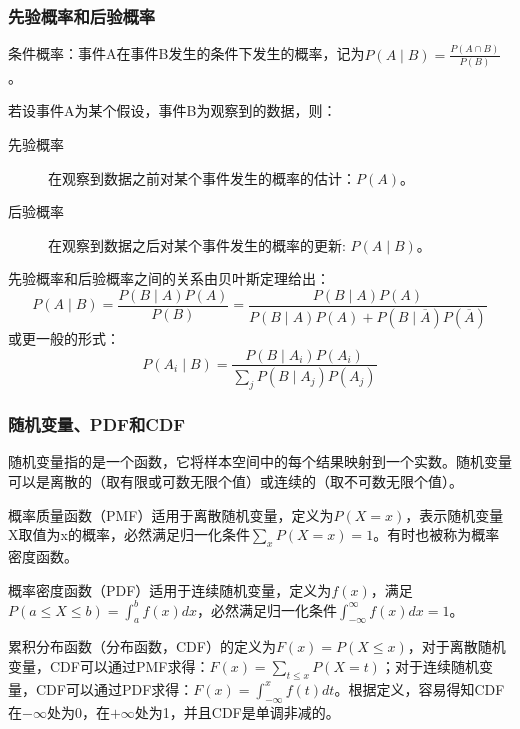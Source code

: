 \documentclass[aspectratio=1610]{ctexbeamer}
\begin{document}
\begin{frame}
    \frametitle{先验概率和后验概率}

    条件概率：事件A在事件B发生的条件下发生的概率，记为$P(A \mid B) = \frac{P(A \cap B)}{P(B)}$。

    \vspace{1em}
    \pause

    若设事件A为某个假设，事件B为观察到的数据，则：
    \begin{description}
        \item[先验概率] 在观察到数据之前对某个事件发生的概率的估计：$P(A)$。
        \item[后验概率] 在观察到数据之后对某个事件发生的概率的更新: $P(A \mid B)$。
    \end{description}

    \vspace{1em}
    \pause

    先验概率和后验概率之间的关系由贝叶斯定理给出：
    \begin{equation}
P(A \mid B) = \frac{P(B \mid A)P(A)}{P(B)} = \frac{P(B \mid A)P(A)}{P(B \mid A)P(A) + P(B \mid \overline{A})P(\overline{A})} \tag{贝叶斯定理的二元形式}
    \end{equation}
    或更一般的形式：
    \begin{equation}
P(A_i \mid B) = \frac{P(B \mid A_i)P(A_i)}{\sum_j P(B \mid A_j)P(A_j)} \tag{贝叶斯定理}
    \end{equation}

\end{frame}

\begin{frame}
    \frametitle{随机变量、PDF和CDF}

    随机变量指的是一个函数，它将样本空间中的每个结果映射到一个实数。随机变量可以是离散的（取有限或可数无限个值）或连续的（取不可数无限个值）。

    \vspace{1em}
    \pause

    概率质量函数（PMF）适用于离散随机变量，定义为$P(X=x)$，表示随机变量X取值为x的概率，必然满足归一化条件$\sum_x P(X=x) = 1$。有时也被称为概率密度函数。

    概率密度函数（PDF）适用于连续随机变量，定义为$f(x)$，满足$P(a \leq X \leq b) = \int_a^b f(x) dx$，必然满足归一化条件$\int_{-\infty}^{\infty} f(x) dx = 1$。

    \vspace{1em}
    \pause

    累积分布函数（分布函数，CDF）的定义为$F(x) = P(X \leq x)$，对于离散随机变量，CDF可以通过PMF求得：$F(x) = \sum_{t \leq x} P(X=t)$；对于连续随机变量，CDF可以通过PDF求得：$F(x) = \int_{-\infty}^x f(t) dt$。根据定义，容易得知CDF在$-\infty$处为0，在$+\infty$处为1，并且CDF是单调非减的。

\end{frame}
\end{document}
